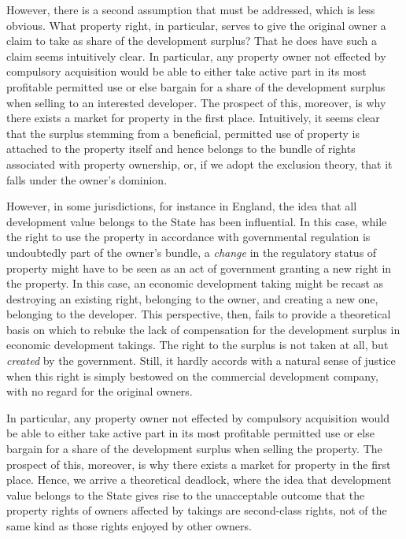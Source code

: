 However, there is a second assumption that must be addressed, which is less obvious. What property right, in particular, serves to give the original owner a claim to take as share of the development surplus? That he does have such a claim seems intuitively clear. In particular, any property owner not effected by compulsory acquisition would be able to either take active part in its most profitable permitted use or else bargain for a share of the development surplus when selling to an interested developer. The prospect of this, moreover, is why there exists a market for property in the first place. Intuitively, it seems clear that the surplus stemming from a beneficial, permitted use of property is attached to the property itself and hence belongs to the bundle of rights associated with property ownership, or, if we adopt the exclusion theory, that it falls under the owner's dominion.

However, in some jurisdictions, for instance in England, the idea that all development value belongs to the State has been influential. In this case, while the right to use the property in accordance with governmental regulation is undoubtedly part of the owner's bundle, a {\it change} in the regulatory status of property might have to be seen as an act of government granting a new right in the property. In this case, an economic development taking might be recast as destroying an existing right, belonging to the owner, and creating a new one, belonging to the developer. This perspective, then, fails to provide a theoretical basis on which to rebuke the lack of compensation for the development surplus in economic development takings. The right to the surplus is not taken at all, but {\it created} by the government. Still, it hardly accords with a natural sense of justice when this right is simply bestowed on the commercial development company, with no regard for the original owners. 

In particular, any property owner not effected by compulsory acquisition would be able to either take active part in its most profitable permitted use or else bargain for a share of the development surplus when selling the property. The prospect of this, moreover, is why there exists a market for property in the first place. Hence, we arrive a theoretical deadlock, where the idea that development value belongs to the State gives rise to the unacceptable outcome that the property rights of owners affected by takings are second-class rights, not of the same kind as those rights enjoyed by other owners.

